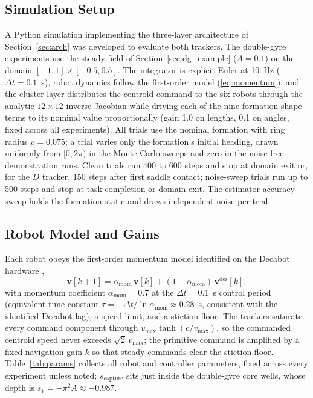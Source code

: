 \documentclass[lettersize,journal]{IEEEtran}
\begin{document}
\subsection{Simulation Setup}

A Python simulation implementing the three-layer architecture of
Section~\ref{sec:arch} was developed to evaluate both trackers.
The double-gyre experiments use the steady field of
Section~\ref{sec:dg_example} ($A = 0.1$) on the domain $[-1, 1] \times
[-0.5, 0.5]$. The integrator is explicit Euler at 10~Hz ($\Delta t =
0.1$~s), robot dynamics follow the first-order model
(\ref{eq:momentum}), and the cluster layer distributes the centroid
command to the six robots through the analytic $12 \times 12$ inverse
Jacobian while driving each of the nine formation shape terms to its
nominal value proportionally (gain 1.0 on lengths, 0.1 on angles, fixed
across all experiments). All trials use the nominal formation with ring
radius $\rho = 0.075$; a trial varies only the formation's initial
heading, drawn uniformly from $[0, 2\pi)$ in the Monte Carlo sweeps and
zero in the noise-free demonstration runs. Clean trials run 400 to 600
steps and stop at domain exit or, for the $D$ tracker, 150 steps after
first saddle contact; noise-sweep trials run up to 500 steps and stop
at task completion or domain exit. The estimator-accuracy sweep holds
the formation static and draws independent noise per trial.

\subsection{Robot Model and Gains}
\label{sec:robot_model}

Each robot obeys the first-order momentum model identified on the
Decabot hardware \cite{14},
\begin{equation}
    \mathbf{v}[k+1] = \alpha_{\text{mom}}\,\mathbf{v}[k]
    + (1 - \alpha_{\text{mom}})\,\mathbf{v}^{\text{des}}[k],
    \label{eq:momentum}
\end{equation}
with momentum coefficient $\alpha_{\text{mom}} = 0.7$ at the
$\Delta t = 0.1$~s control period (equivalent time constant $\tau =
-\Delta t/\ln\alpha_{\text{mom}} \approx 0.28$~s, consistent with the
identified Decabot lag), a speed limit, and a stiction floor.
The trackers saturate every command component through
$v_{\max}\tanh(c/v_{\max})$, so the commanded centroid speed never
exceeds $\sqrt{2}\,v_{\max}$; the primitive command is amplified by a
fixed navigation gain $k$ so that steady commands clear the stiction
floor. Table~\ref{tab:params} collects all robot and controller
parameters, fixed across every experiment unless noted;
$s_{\text{capture}}$ sits just inside the double-gyre core wells, whose
depth is $s_1 = -\pi^2 A \approx -0.987$.
\end{document}
